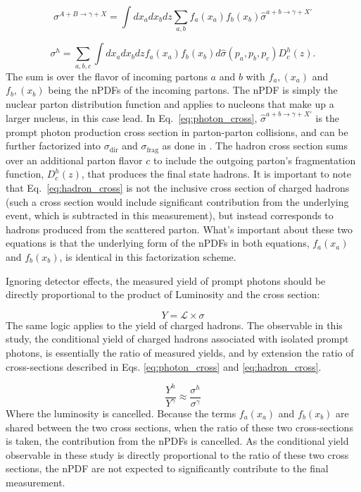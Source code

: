 \begin{equation}
  \sigma^{A+B\rightarrow\gamma+X} = \int dx_a dx_b dz \sum_{a,b}f_{a}(x_a)f_{b}(x_b) \hat{\sigma}^{a+b\rightarrow\gamma+X'}
\end{equation}
\label{eq:photon_cross}

\begin{equation}
  \sigma^h= \sum_{a,b,c} \int dx_a dx_b dz f_a(x_a) f_b(x_b) d\hat{\sigma}(p_a,p_b,p_c) D_c^h(z).
  \label{eq:hadron_cross}
\end{equation}
The sum is over the flavor of incoming partons $a$ and  $b$ with $f_{a},(x_a)$ and  $f_{b},(x_b)$ being the nPDFs of the incoming partons. The nPDF is simply the nuclear parton distribution function and applies to nucleons that make up a larger nucleus, in this case lead. In Eq.~\ref{eq:photon_cross}, $\hat{\sigma}^{a+b\rightarrow\gamma+X'}$ is the prompt photon production cross section in parton-parton collisions, and can be further factorized into $\sigma_\mathrm{dir}$ and $\sigma_\mathrm{frag}$ as done in \cite{williams2018}. The hadron cross section sums over an additional parton flavor $c$ to include the outgoing parton's fragmentation function, $D_c^h(z)$, that produces the final state hadrons. It is important to note that Eq.~\ref{eq:hadron_cross} is not the inclusive cross section of charged hadrons (such a cross section would include significant contribution from the underlying event, which is subtracted in this measurement), but instead corresponds to hadrons produced from the scattered parton. What's important about these two equations is that the underlying form of the nPDFs in both equations, $f_{a}(x_a)$ and $f_{b}(x_b)$, is identical in this factorization scheme. 

Ignoring detector effects, the measured yield of prompt photons should be directly proportional to the product of Luminosity and the cross section:

\begin{equation}
  Y = \mathcal{L}\times\sigma
\end{equation}
The same logic applies to the yield of charged hadrons. The observable in this study, the conditional yield of charged hadrons associated with isolated prompt photons, is essentially the ratio of measured yields, and by extension the ratio of cross-sections described in Eqs. \ref{eq:photon_cross} and \ref{eq:hadron_cross}. 

\begin{equation}
  \frac{Y^h}{Y^\gamma} \approx \frac{\sigma^h}{\sigma^\gamma}
  \label{eq:yield_ratios}
\end{equation}
Where the luminosity is cancelled. Because the terms $f_{a}(x_a)$ and $f_{b}(x_b)$ are shared between the two cross sections, when the ratio of these two cross-sections is taken, the contribution from the nPDFs is cancelled. As the conditional yield observable in these study is directly proportional to the ratio of these two cross sections, the nPDF are not expected to significantly contribute to the final measurement.

